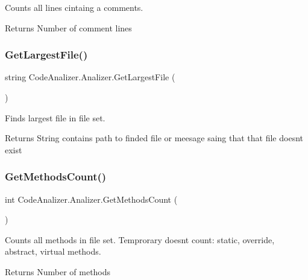 Counts all lines cintaing a comments. 

\begin{DoxyReturn}{Returns}
Number of comment lines
\end{DoxyReturn}
\mbox{\label{class_code_analizer_1_1_analizer_a05eb6e6a5592ea98f04b8cd3a146b329}} 
\subsubsection{\texorpdfstring{Get\+Largest\+File()}{GetLargestFile()}}
{\footnotesize\ttfamily string Code\+Analizer.\+Analizer.\+Get\+Largest\+File (\begin{DoxyParamCaption}{ }\end{DoxyParamCaption})}



Finds largest file in file set. 

\begin{DoxyReturn}{Returns}
String contains path to finded file or meesage saing that that file doesnt exist
\end{DoxyReturn}
\mbox{\label{class_code_analizer_1_1_analizer_ac11fc64eb4af5e8470c1c25d1dcb48e2}} 
\subsubsection{\texorpdfstring{Get\+Methods\+Count()}{GetMethodsCount()}}
{\footnotesize\ttfamily int Code\+Analizer.\+Analizer.\+Get\+Methods\+Count (\begin{DoxyParamCaption}{ }\end{DoxyParamCaption})}



Counts all methods in file set. Temprorary doesnt count\+: static, override, abstract, virtual methods. 

\begin{DoxyReturn}{Returns}
Number of methods
\end{DoxyReturn}
\mbox{\label{class_code_analizer_1_1_analizer_ac3fb4201ac5fbb69662fcc983c435f41}} 
